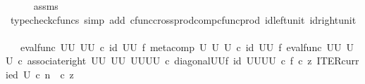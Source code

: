 \begin{isabellebody}
\ \ \ \ \isamarkupfalse%
\ assms\ \isamarkupfalse%
\ {\isacharparenleft}{\kern0pt}typecheck{\isacharunderscore}{\kern0pt}cfuncs{\isacharcomma}{\kern0pt}\ simp\ add{\isacharcolon}{\kern0pt}\ cfunc{\isacharunderscore}{\kern0pt}cross{\isacharunderscore}{\kern0pt}prod{\isacharunderscore}{\kern0pt}comp{\isacharunderscore}{\kern0pt}cfunc{\isacharunderscore}{\kern0pt}prod\ id{\isacharunderscore}{\kern0pt}left{\isacharunderscore}{\kern0pt}unit{}\ id{\isacharunderscore}{\kern0pt}right{\isacharunderscore}{\kern0pt}unit{}{\isacharparenright}{\kern0pt}\isanewline
\ \ \isamarkupfalse%
\ \isamarkupfalse%
\ {\isachardoublequoteopen}{\isachardot}{\kern0pt}{\isachardot}{\kern0pt}{\isachardot}{\kern0pt}\ {\isacharequal}{\kern0pt}\ {\isacharparenleft}{\kern0pt}eval{\isacharunderscore}{\kern0pt}func\ {\isacharparenleft}{\kern0pt}U\isactrlbsup U\isactrlesup {\isacharparenright}{\kern0pt}\ {\isacharparenleft}{\kern0pt}U\isactrlbsup U\isactrlesup {\isacharparenright}{\kern0pt}{\isacharparenright}{\kern0pt}\ {\isasymcirc}\isactrlsub c\ {\isacharparenleft}{\kern0pt}id\ {\isacharparenleft}{\kern0pt}U\isactrlbsup U\isactrlesup {\isacharparenright}{\kern0pt}\ {\isasymtimes}\isactrlsub f\ {\isacharparenleft}{\kern0pt}{\isacharparenleft}{\kern0pt}meta{\isacharunderscore}{\kern0pt}comp\ U\ U\ U\ {\isasymcirc}\isactrlsub c\ {\isacharparenleft}{\kern0pt}id\ {\isacharparenleft}{\kern0pt}U\isactrlbsup U\isactrlesup {\isacharparenright}{\kern0pt}\ {\isasymtimes}\isactrlsub f\ eval{\isacharunderscore}{\kern0pt}func\ {\isacharparenleft}{\kern0pt}U\isactrlbsup U\isactrlesup {\isacharparenright}{\kern0pt}\ {\isacharparenleft}{\kern0pt}U\isactrlbsup U\isactrlesup {\isacharparenright}{\kern0pt}{\isacharparenright}{\kern0pt}\ {\isasymcirc}\isactrlsub c\ {\isacharparenleft}{\kern0pt}associate{\isacharunderscore}{\kern0pt}right\ {\isacharparenleft}{\kern0pt}U\isactrlbsup U\isactrlesup {\isacharparenright}{\kern0pt}\ {\isacharparenleft}{\kern0pt}U\isactrlbsup U\isactrlesup {\isacharparenright}{\kern0pt}\ {\isacharparenleft}{\kern0pt}{\isacharparenleft}{\kern0pt}U\isactrlbsup U\isactrlesup {\isacharparenright}{\kern0pt}\isactrlbsup U\isactrlbsup U\isactrlesup \isactrlesup {\isacharparenright}{\kern0pt}{\isacharparenright}{\kern0pt}\ {\isasymcirc}\isactrlsub c\ {\isacharparenleft}{\kern0pt}diagonal{\isacharparenleft}{\kern0pt}U\isactrlbsup U\isactrlesup {\isacharparenright}{\kern0pt}{\isasymtimes}\isactrlsub f\ id\ {\isacharparenleft}{\kern0pt}{\isacharparenleft}{\kern0pt}U\isactrlbsup U\isactrlesup {\isacharparenright}{\kern0pt}\isactrlbsup U\isactrlbsup U\isactrlesup \isactrlesup {\isacharparenright}{\kern0pt}{\isacharparenright}{\kern0pt}{\isacharparenright}{\kern0pt}\isactrlsup {\isasymsharp}\ {\isacharparenright}{\kern0pt}{\isacharparenright}{\kern0pt}{\isasymcirc}\isactrlsub c\ {\isasymlangle}f\ {\isasymcirc}\isactrlsub c\ z{\isacharcomma}{\kern0pt}\ ITER{\isacharunderscore}{\kern0pt}curried\ U\ {\isasymcirc}\isactrlsub c\ {\isacharparenleft}{\kern0pt}n\ \ {\isasymcirc}\isactrlsub c\ z{\isacharparenright}{\kern0pt}{\isasymrangle}{\isachardoublequoteclose}\isanewline

\end{isabellebody}
